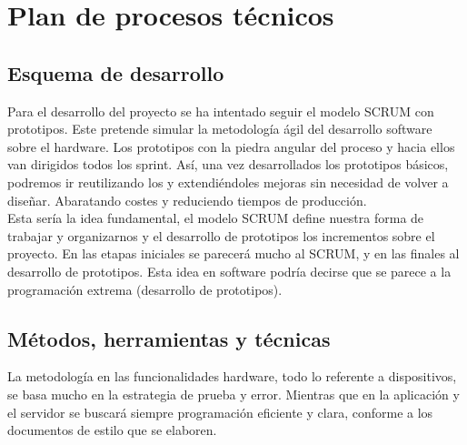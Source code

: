 \chapter{Plan de procesos técnicos}
\section{Esquema de desarrollo}
Para el desarrollo del proyecto se ha intentado seguir el modelo SCRUM con prototipos. Este pretende simular la metodología ágil del desarrollo software sobre el hardware. Los prototipos con la piedra angular del proceso y hacia ellos van dirigidos todos los sprint. Así, una vez desarrollados los prototipos básicos, podremos ir reutilizando los y extendiéndoles mejoras sin necesidad de volver a diseñar. Abaratando costes y reduciendo tiempos de producción.\\

Esta sería la idea fundamental, el modelo SCRUM define nuestra forma de trabajar y organizarnos y el desarrollo de prototipos los incrementos sobre el proyecto. En las etapas iniciales se parecerá mucho al SCRUM, y en las finales al desarrollo de prototipos. Esta idea en software podría decirse que se parece a la programación extrema (desarrollo de prototipos).
\section{Métodos, herramientas y técnicas}
La metodología en las funcionalidades hardware, todo lo referente a dispositivos, se basa mucho en la estrategia de prueba y error. Mientras que en la aplicación y el servidor se buscará siempre programación eficiente y clara, conforme a los documentos de estilo que se elaboren.

